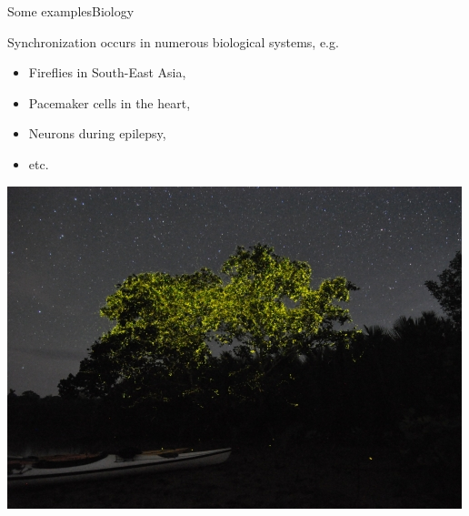 \documentclass[usenames,dvipsnames,svgnames,10pt,aspectratio=169]{beamer}
\begin{document}
\begin{frame}[t, c]{Some examples}{Biology}
  \begin{minipage}{.38\textwidth}
    Synchronization occurs in numerous biological systems, e.g.
    \medskip
    \begin{itemize}
    \item Fireflies in South-East Asia,
    \item Pacemaker cells in the heart,
    \item Neurons during epilepsy,
    \item etc.
    \end{itemize}
  \end{minipage}%
  \hfill
  \begin{minipage}{.58\textwidth}
    \centering
    \includegraphics[width=.9\textwidth]{fireflies}
  \end{minipage}

  \vspace{1cm}
\end{frame}
\end{document}
